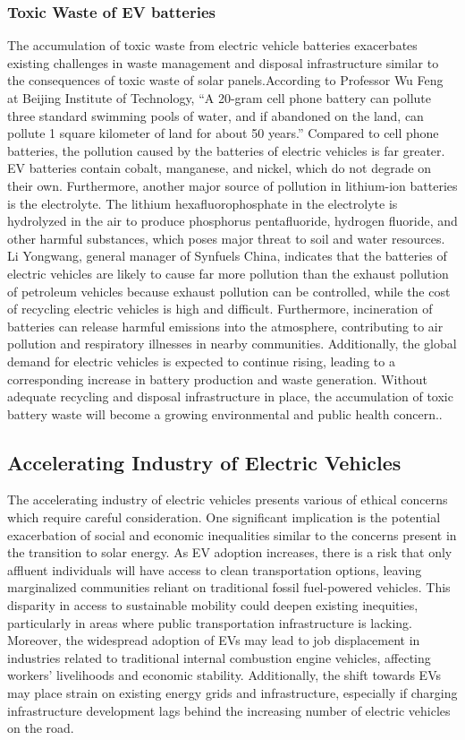 \documentclass[10pt,twocolumn]{article}
\begin{document}
\subsubsection{Toxic Waste of EV batteries}
The accumulation of toxic waste from electric vehicle batteries exacerbates existing challenges in waste management and disposal infrastructure similar to the consequences of toxic waste of solar panels.According to Professor Wu Feng at Beijing Institute of Technology, “A 20-gram cell phone battery can pollute three standard swimming pools of water, and if abandoned on the land, can pollute 1 square kilometer of land for about 50 years.” Compared to cell phone batteries, the pollution caused by the batteries of electric vehicles is far greater. EV batteries contain cobalt, manganese, and nickel, which do not degrade on their own. Furthermore, another major source of pollution in lithium-ion batteries is the electrolyte. The lithium hexafluorophosphate in the electrolyte is hydrolyzed in the air to produce phosphorus pentafluoride, hydrogen fluoride, and other harmful substances, which poses major threat to soil and water resources. Li Yongwang, general manager of Synfuels China, indicates that the batteries of electric vehicles are likely to cause far more pollution than the exhaust pollution of petroleum vehicles because exhaust pollution can be controlled, while the cost of recycling electric vehicles is high and difficult. Furthermore, incineration of batteries can release harmful emissions into the atmosphere, contributing to air pollution and respiratory illnesses in nearby communities. Additionally, the global demand for electric vehicles is expected to continue rising, leading to a corresponding increase in battery production and waste generation. Without adequate recycling and disposal infrastructure in place, the accumulation of toxic battery waste will become a growing environmental and public health concern..
 
\subsection{Accelerating Industry of Electric Vehicles}
The accelerating industry of electric vehicles presents various of ethical concerns which require careful consideration. One significant implication is the potential exacerbation of social and economic inequalities similar to the concerns present in the transition to solar energy. As EV adoption increases, there is a risk that only affluent individuals will have access to clean transportation options, leaving marginalized communities reliant on traditional fossil fuel-powered vehicles. This disparity in access to sustainable mobility could deepen existing inequities, particularly in areas where public transportation infrastructure is lacking. Moreover, the widespread adoption of EVs may lead to job displacement in industries related to traditional internal combustion engine vehicles, affecting workers' livelihoods and economic stability. Additionally, the shift towards EVs may place strain on existing energy grids and infrastructure, especially if charging infrastructure development lags behind the increasing number of electric vehicles on the road. 
\end{document}
